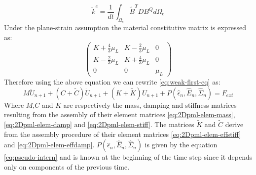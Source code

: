 \begin{equation}
\tilde{k}^{e} = \frac{1}{dt} \int_{\Omega_e} \tilde{B}^T D B^Q d\Omega_e
\label{eq:2Dpml-elem-effstiff}
\end{equation}
Under the plane-strain assumption the material constitutive matrix is expressed as:
\begin{equation}
\begin{pmatrix}
K+\frac{4}{3}\mu_L& K-\frac{2}{3}\mu_L&0\\
K-\frac{2}{3}\mu_L&K+\frac{4}{3}\mu_L&0\\
0&0&\mu_L
\end{pmatrix}
\end{equation}
Therefore using the above equation we can rewrite \ref{eq:weak-first-eq} as:
\begin{equation}
M\ddot{U}_{n+1} + \left(C+\tilde{C}\right)\dot{U}_{n+1} + \left(K+\tilde{K}\right)U_{n+1} + P(\hat{\epsilon}_n,\hat{E}_n,\hat{\Sigma}_n) = F_{ext}
\label{eq:2Dpml-discrete-motion}
\end{equation}
Where $M$,$C$ and $K$ are respectively the mass, damping and stiffness matrices resulting from the assembly of their element matrices \ref{eq:2Dpml-elem-mass}, \ref{eq:2Dpml-elem-damp} and \ref{eq:2Dpml-elem-stiff}. The matrices $\tilde{K}$ and $\tilde{C}$ derive from the assembly procedure of their element matrices \ref{eq:2Dpml-elem-effstiff} and \ref{eq:2Dpml-elem-effdamp}. $P(\hat{\epsilon}_n,\hat{E}_n,\hat{\Sigma}_n)$ is given by the equation \ref{eq:pseudo-intern} and is known at the beginning of the time step since it depends only on components of the previous time. 
